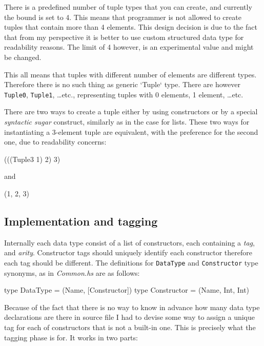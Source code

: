 \documentclass[12pt,a4paper]{report}
\begin{document}
There is a predefined number of tuple types that you can create, and currently
the bound is set to 4. This means that programmer is not allowed to create
tuples that contain more than 4 elements. This design decision is due to the
fact that from my perspective it is better to use custom structured data type
for readability reasons. The limit of 4 however, is an experimental value and
might be changed.

This all means that tuples with different number of elements are different
types. Therefore there is no such thing as generic `Tuple` type. There are
however \texttt{Tuple0}, \texttt{Tuple1}, \ldots etc., representing tuples with
0 elements, 1 element, \ldots etc.

There are two ways to create a tuple either by using constructors or by a
special \textit{syntactic sugar} construct, similarly as in the case for lists.
These two ways for instantiating a 3-element tuple are equivalent, with the
preference for the second one, due to readability concerns:

\vspace*{0.2in}
\begin{code}[style=haskell]
(((Tuple3 1) 2) 3)
\end{code}

and

\vspace*{0.2in}
\begin{code}[style=haskell]
(1, 2, 3)
\end{code}

\subsection{Implementation and tagging}
Internally each data type consist of a list of constructors, each containing a
\textit{tag}, and \textit{arity}. Constructor tags should uniquely identify
each constructor therefore each tag should be different. The definitions
for \texttt{DataType} and \texttt{Constructor} type synonyms, as in
\textit{Common.hs} are as follows:

\vspace*{0.2in}
\begin{code}[style=haskell]
type DataType = (Name, [Constructor])
type Constructor = (Name, Int, Int)
\end{code}

Because of the fact that there is no way to know in advance how many data type
declarations are there in source file I had to devise some way to assign a
unique tag for each of constructors that is not a built-in one. This is
precisely what the tagging phase is for. It works in two parts:
\end{document}
